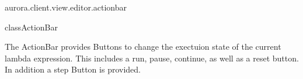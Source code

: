 \begin{texdocpackage}{aurora.client.view.editor.actionbar}
\label{texdoclet:aurora.client.view.editor.actionbar}

\begin{texdocclass}{class}{ActionBar}
\label{texdoclet:aurora.client.view.editor.actionbar.ActionBar}
\begin{texdocclassintro}
The ActionBar provides Buttons to change the exectuion state of the current lambda expression.
 This includes a run, pause, continue, as well as a reset button.
 In addition a step Button is provided.\end{texdocclassintro}
\begin{texdocclassconstructors}
\end{texdocclassconstructors}
\begin{texdocclassmethods}
\end{texdocclassmethods}
\end{texdocclass}


\end{texdocpackage}



